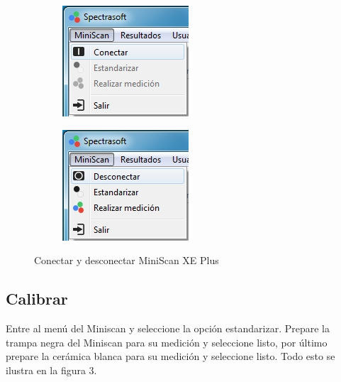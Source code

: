 \begin{figure}[H]
\centering
\begin{subfigure}{.5\textwidth}
  \centering
  \includegraphics[width=.6\linewidth]{./img/conectar.jpg}
\end{subfigure}%
\begin{subfigure}{.5\textwidth}
  \centering
  \includegraphics[width=.6\linewidth]{./img/desconectar.jpg}
\end{subfigure}
\caption{Conectar y desconectar MiniScan XE Plus}
\end{figure}

	\subsection{Calibrar}
		Entre al men\'{u} del Miniscan y seleccione la opci\'{o}n estandarizar. Prepare la trampa negra del Miniscan para su medici\'{o}n y seleccione listo, por \'{u}ltimo prepare la cer\'{a}mica blanca para su medici\'{o}n y seleccione listo. Todo esto se ilustra en la figura 3.
	

